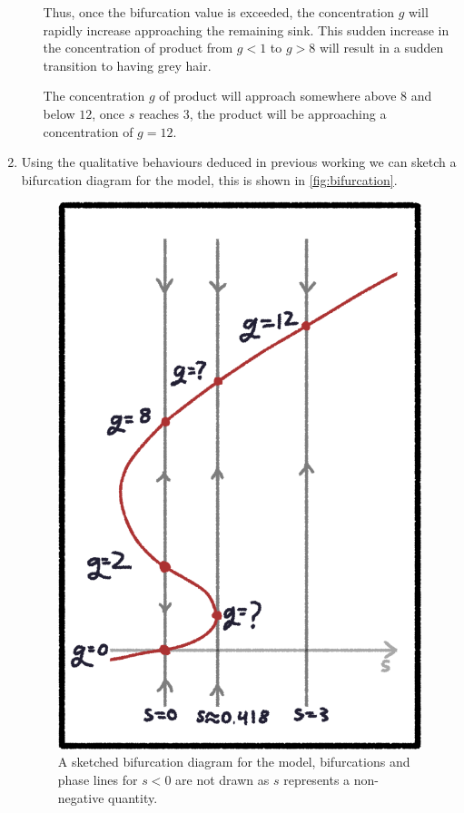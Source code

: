 \documentclass[a4paper, 11pt]{article}
\begin{document}
\begin{enumerate}[label=(\alph*)]
\begin{itemize}
  Thus, once the bifurcation value is exceeded, the concentration $g$ will rapidly increase approaching the remaining sink. This sudden increase in the concentration of product from $g<1$ to $g>8$ will result in a sudden transition to having grey hair.  

  The concentration $g$ of product will approach somewhere above $8$ and below $12$, once $s$ reaches $3$, the product will be approaching a concentration of $g=12$.
\end{itemize} 


\item Using the qualitative behaviours deduced in previous working we can sketch a bifurcation diagram for the model, this is shown in \autoref{fig:bifurcation}.

\begin{figure}[H]
  \centering
  \begin{minipage}{0.4\textwidth}
    \includegraphics*[width=\textwidth]{images/bifurcation.png}
    \caption{A sketched bifurcation diagram for the model, bifurcations and phase lines for $s<0$ are not drawn as $s$ represents a non-negative quantity.}
    \label{fig:bifurcation}
  \end{minipage}
\end{figure}


\end{enumerate}
\end{document}
